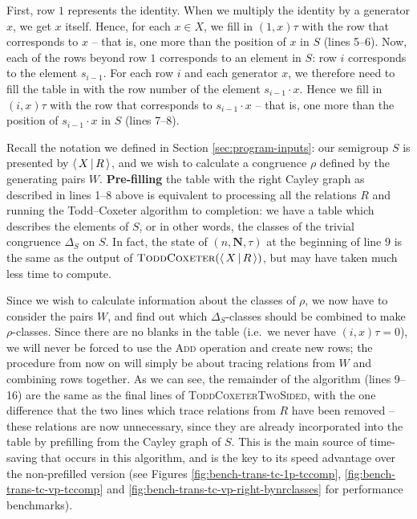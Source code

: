 First, row $1$ represents the identity.  When we multiply the identity by a
generator $x$, we get $x$ itself.  Hence, for each $x \in X$, we fill in
$(1, x)\tau$ with the row that corresponds to $x$ -- that is, one more than the
position of $x$ in $S$ (lines 5--6).  Now, each of the rows beyond row $1$
corresponds to an element in $S$: row $i$ corresponds to the element $s_{i-1}$.
For each row $i$ and each generator $x$, we therefore need to fill the table in
with the row number of the element $s_{i-1} \cdot x$.  Hence we fill in
$(i, x)\tau$ with the row that corresponds to $s_{i-1} \cdot x$ -- that is, one
more than the position of $s_{i-1} \cdot x$ in $S$ (lines 7--8).

Recall the notation we defined in Section \ref{sec:program-inputs}: our
semigroup $S$ is presented by $\left\langle \, X \, \middle| \, R \, \right\rangle$, and we wish to calculate a congruence
$\rho$ defined by the generating pairs $W$.  \textbf{Pre-filling} the table with the
right Cayley graph as described in lines 1--8 above is equivalent to processing all the
relations $R$ and running the Todd--Coxeter algorithm to completion: we have a table which
describes the elements of $S$, or in other words, the classes of the trivial
congruence $\Delta_S$ on $S$.  In fact, the state of $(n, \mathbf{N}, \tau)$ at
the beginning of line 9 is the same as the output of
$\textsc{ToddCoxeter}(\left\langle \, X \, \middle| \, R \, \right\rangle)$, but may have taken much less time to compute.

Since we wish to calculate information about the classes of $\rho$, we now
have to consider the pairs $W$, and find out which $\Delta_S$-classes should be
combined to make $\rho$-classes.  Since there are no blanks in the table (i.e.~we never have
$(i,x)\tau=0$), we will never be forced to use the \textsc{Add} operation and
create new rows; the procedure from now on will simply be about tracing
relations from $W$ and combining rows together.  As we can see, the remainder of
the algorithm (lines 9--16) are the same as the final lines of
\textsc{ToddCoxeterTwoSided}, with the one difference that the two lines which
trace relations from $R$ have been removed -- these relations are now
unnecessary, since they are already incorporated into the table by prefilling
from the Cayley graph of $S$.  This is the main source of time-saving that
occurs in this algorithm, and is the key to its speed advantage over the
non-prefilled version (see Figures
\ref{fig:bench-trans-tc-1p-tccomp},
\ref{fig:bench-trans-tc-vp-tccomp} and
\ref{fig:bench-trans-tc-vp-right-bynrclasses} for performance benchmarks).

